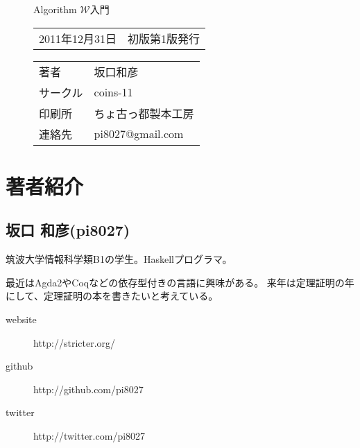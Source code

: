 
\begin{figure}[b]

{\LARGE Algorithm $\mathcal W$入門}

\hrulefill

\begin{tabular}{rl}
2011年12月31日 & 初版第1版発行
\end{tabular}

\vspace{1zh}

\begin{tabular}{ll}
著者     & 坂口和彦 \\
サークル & coins-11 \\
印刷所   & ちょ古っ都製本工房 \\
連絡先   & pi8027@gmail.com \\
\end{tabular}

\hrulefill

\vspace{2zh}

\end{figure}

\section*{著者紹介}

\subsection*{坂口 和彦(pi8027)}

筑波大学情報科学類B1の学生。Haskellプログラマ。

最近はAgda2やCoqなどの依存型付きの言語に興味がある。
来年は定理証明の年にして、定理証明の本を書きたいと考えている。

\begin{description}
\item[website] http://stricter.org/
\item[github] http://github.com/pi8027
\item[twitter] http://twitter.com/pi8027
\end{description}

